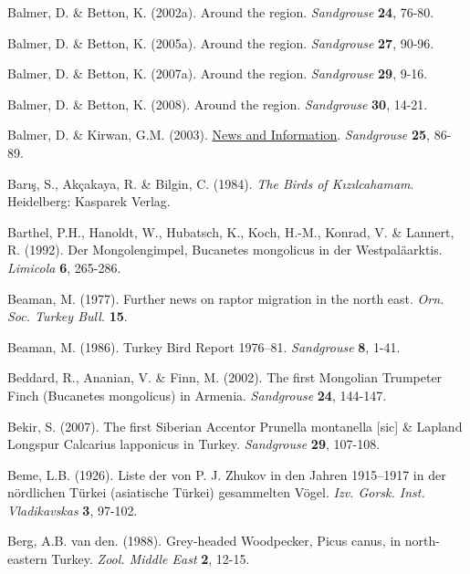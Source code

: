 \documentclass[
  10.5pt,
  a4paper,
  DIV=11,
  numbers=noendperiod,
  twocolumn]{scrreprt}
\newlength{\cslhangindent}
\newenvironment{CSLReferences}[2] %
 {\begin{list}{}{%
  \setlength{\itemindent}{0pt}
  \setlength{\leftmargin}{0pt}
  \setlength{\parsep}{0pt}
  \ifodd #1
   \setlength{\leftmargin}{\cslhangindent}
   \setlength{\itemindent}{-1\cslhangindent}
  \fi
  \setlength{\itemsep}{#2\baselineskip}}}
 {\end{list}}
\begin{document}
\begin{CSLReferences}{1}{1}
Balmer, D. \& Betton, K. (2002a). {Around the region}. \emph{Sandgrouse}
\textbf{24}, 76-80.

Balmer, D. \& Betton, K. (2005a). {Around the region}. \emph{Sandgrouse}
\textbf{27}, 90-96.

Balmer, D. \& Betton, K. (2007a). {Around the region}. \emph{Sandgrouse}
\textbf{29}, 9-16.

Balmer, D. \& Betton, K. (2008). {Around the region}. \emph{Sandgrouse}
\textbf{30}, 14-21.

Balmer, D. \& Kirwan, G.M. (2003).
\href{https://www.biodiversitylibrary.org/page/44724640}{{News and
Information}}. \emph{Sandgrouse} \textbf{25}, 86-89.

Barış, S., Akçakaya, R. \& Bilgin, C. (1984). \emph{{The Birds of
Kızılcahamam}}. Heidelberg: Kasparek Verlag.

Barthel, P.H., Hanoldt, W., Hubatsch, K., Koch, H.-M., Konrad, V. \&
Lannert, R. (1992). {Der Mongolengimpel, {Bucanetes mongolicus} in der
Westpaläarktis}. \emph{Limicola} \textbf{6}, 265-286.

Beaman, M. (1977). {Further news on raptor migration in the north east}.
\emph{Orn. Soc. Turkey Bull.} \textbf{15}.

Beaman, M. (1986). {Turkey Bird Report 1976--81}. \emph{Sandgrouse}
\textbf{8}, 1-41.

Beddard, R., Ananian, V. \& Finn, M. (2002). {The first Mongolian
Trumpeter Finch ({Bucanetes mongolicus}) in Armenia}. \emph{Sandgrouse}
\textbf{24}, 144-147.

Bekir, S. (2007). {The first Siberian Accentor {Prunella montanella}
{[}sic{]} \& Lapland Longspur {Calcarius lapponicus} in Turkey}.
\emph{Sandgrouse} \textbf{29}, 107-108.

Beme, L.B. (1926). {Liste der von P. J. Zhukov in den Jahren 1915--1917
in der nördlichen Türkei (asiatische Türkei) gesammelten Vögel}.
\emph{Izv. Gorsk. Inst. Vladikavskas} \textbf{3}, 97-102.

Berg, A.B. van den. (1988). {Grey-headed Woodpecker, {Picus canus}, in
north-eastern Turkey}. \emph{Zool. Middle East} \textbf{2}, 12-15.


\end{CSLReferences}
\end{document}
